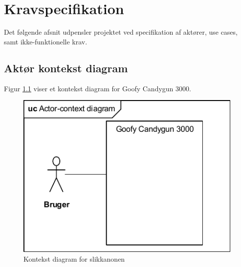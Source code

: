 \renewcommand{\labelenumii}{\theenumii}
\renewcommand{\theenumii}{\theenumi.\arabic{enumii}.}
\chapter{Kravspecifikation}
\label{afsnit:kravspecifikation}
Det følgende afsnit udpensler projektet ved specifikation af aktører, use cases, samt ikke-funktionelle krav.

\section{Aktør kontekst diagram}
Figur \ref{ref:kontekstDiagram} viser et kontekst diagram for Goofy Candygun 3000.
\begin{figure}[H]
	\centering
	\includegraphics[]{Kravspecifikation/images/kontekstDiagram}
	\caption{Kontekst diagram for slikkanonen}
	\label{ref:kontekstDiagram}
\end{figure}

